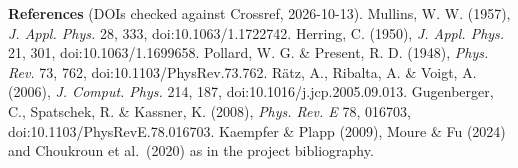 \documentclass[11pt]{article}
\begin{document}
{\small\raggedright\textbf{References} (DOIs checked against Crossref, 2026-10-13).
Mullins, W. W. (1957), \emph{J. Appl. Phys.} 28, 333, doi:10.1063/1.1722742.
Herring, C. (1950), \emph{J. Appl. Phys.} 21, 301, doi:10.1063/1.1699658.
Pollard, W. G. \& Present, R. D. (1948), \emph{Phys. Rev.} 73, 762, doi:10.1103/PhysRev.73.762.
R\"atz, A., Ribalta, A. \& Voigt, A. (2006), \emph{J. Comput. Phys.} 214, 187, doi:10.1016/j.jcp.2005.09.013.
Gugenberger, C., Spatschek, R. \& Kassner, K. (2008), \emph{Phys. Rev. E} 78, 016703, doi:10.1103/PhysRevE.78.016703.
Kaempfer \& Plapp (2009), Moure \& Fu (2024) and Choukroun et al.\ (2020) as in the project bibliography.\par}
\end{document}
